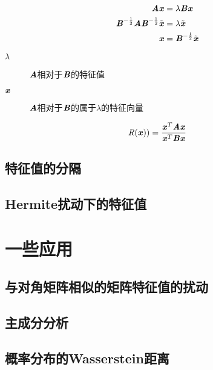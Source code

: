 \begin{definition}
    $$
    \begin{aligned}
        \MA \Vx & = \lambda \MB \Vx \\
        \MB^{-\frac{1}{2}}\MA \MB^{- \frac{1}{2}}\tilde{\Vx} & = \lambda \tilde{\Vx} \\
        \Vx & = \MB^{-\frac{1}{2}}\tilde{\Vx}
    \end{aligned}
    $$
    \begin{description}
        \item[$\lambda$] $\MA$相对于$\MB$的特征值
        \item[$\Vx$] $\MA$相对于$\MB$的属于$\lambda$的特征向量
    \end{description}
\end{definition}

\begin{definition}
    $$
    \SR(\Vx)) = \frac{\Vx^T \MA \Vx}{\Vx^T \MB \Vx}
    $$
\end{definition}

\subsection{特征值的分隔}
\label{sub:特征值的分隔}

\subsection{Hermite扰动下的特征值}
\label{sub:Hermite扰动下的特征值}

\section{一些应用}
\label{sec:一些应用}

\subsection{与对角矩阵相似的矩阵特征值的扰动}
\label{sub:与对角矩阵相似的矩阵特征值的扰动}

\subsection{主成分分析}
\label{sub:主成分分析}

\subsection{概率分布的Wasserstein距离}
\label{sub:概率分布的Wasserstein距离}


